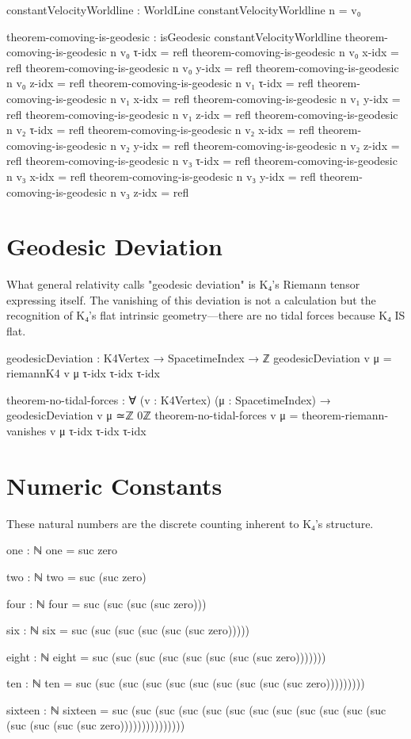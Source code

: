 \documentclass[11pt,a4paper]{book}
\begin{document}
\begin{code}
constantVelocityWorldline : WorldLine
constantVelocityWorldline n = v₀

theorem-comoving-is-geodesic : isGeodesic constantVelocityWorldline
theorem-comoving-is-geodesic n v₀ τ-idx = refl
theorem-comoving-is-geodesic n v₀ x-idx = refl
theorem-comoving-is-geodesic n v₀ y-idx = refl
theorem-comoving-is-geodesic n v₀ z-idx = refl
theorem-comoving-is-geodesic n v₁ τ-idx = refl
theorem-comoving-is-geodesic n v₁ x-idx = refl
theorem-comoving-is-geodesic n v₁ y-idx = refl
theorem-comoving-is-geodesic n v₁ z-idx = refl
theorem-comoving-is-geodesic n v₂ τ-idx = refl
theorem-comoving-is-geodesic n v₂ x-idx = refl
theorem-comoving-is-geodesic n v₂ y-idx = refl
theorem-comoving-is-geodesic n v₂ z-idx = refl
theorem-comoving-is-geodesic n v₃ τ-idx = refl
theorem-comoving-is-geodesic n v₃ x-idx = refl
theorem-comoving-is-geodesic n v₃ y-idx = refl
theorem-comoving-is-geodesic n v₃ z-idx = refl
\end{code}

\section{Geodesic Deviation}

What general relativity calls "geodesic deviation" is K₄'s Riemann tensor expressing itself. The vanishing of this deviation is not a calculation but the recognition of K₄'s flat intrinsic geometry—there are no tidal forces because K₄ IS flat.

\begin{code}
geodesicDeviation : K4Vertex → SpacetimeIndex → ℤ
geodesicDeviation v μ = 
  riemannK4 v μ τ-idx τ-idx τ-idx

theorem-no-tidal-forces : ∀ (v : K4Vertex) (μ : SpacetimeIndex) →
  geodesicDeviation v μ ≃ℤ 0ℤ
theorem-no-tidal-forces v μ = theorem-riemann-vanishes v μ τ-idx τ-idx τ-idx
\end{code}

\section{Numeric Constants}

These natural numbers are the discrete counting inherent to K₄'s structure.

\begin{code}
one : ℕ
one = suc zero

two : ℕ
two = suc (suc zero)

four : ℕ
four = suc (suc (suc (suc zero)))

six : ℕ
six = suc (suc (suc (suc (suc (suc zero)))))

eight : ℕ
eight = suc (suc (suc (suc (suc (suc (suc (suc zero)))))))

ten : ℕ
ten = suc (suc (suc (suc (suc (suc (suc (suc (suc (suc zero)))))))))

sixteen : ℕ
sixteen = suc (suc (suc (suc (suc (suc (suc (suc (suc (suc (suc (suc (suc (suc (suc (suc zero)))))))))))))))
\end{code}
\end{document}
